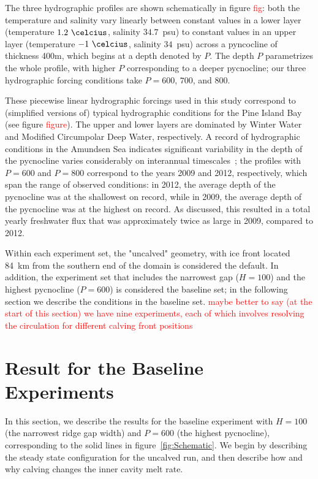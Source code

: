 \documentclass[draft]{agujournal2019}
\newcommand{\red}[1]{\textcolor{red}{#1}}
\begin{document}
The three hydrographic profiles are shown schematically in figure \red{fig}: both the temperature and salinity vary linearly between constant values in a lower layer (temperature $1.2~\si{\celcius}$, salinity $34.7$~psu) to constant values in an upper layer (temperature $-1~\si{\celcius}$, salinity $34$~psu) across a pyncocline of thickness 400m, which begins at a depth denoted by $P$. The depth $P$ parametrizes the whole profile, with higher $P$ corresponding to a deeper pycnocline; our three hydrographic forcing conditions take $P = 600$, $700$, and $800$. 

These piecewise linear hydrographic forcings used in this study correspond to (simplified versions of) typical hydrographic conditions for the Pine Island Bay~\cite{Jacobs1996GRL, Dutrieux2014Science, Jenkins2018NatureGeo} (see figure \red{figure}). The upper and lower layers are dominated by Winter Water and Modified Circumpolar Deep Water, respectively. A record of hydrographic conditions in the Amundsen Sea indicates significant variability in the depth of the pycnocline varies considerably on interannual timescales~\cite{Dutrieux2014Science}; the profiles with $P = 600$ and $P = 800$ correspond to the years 2009 and 2012, respectively, which span the range of observed conditions: in 2012, the average depth of the pycnocline was at the shallowest on record, while in 2009, the average depth of the pycnocline was at the highest on record. As discussed, this resulted in a total yearly freshwater flux that was approximately twice as large in 2009, compared to 2012.

Within each experiment set, the "uncalved" geometry, with ice front located 84~km from the southern end of the domain is considered the default. In addition, the experiment set that includes the narrowest gap ($H = 100$) and the highest pycnocline ($P = 600$) is considered the baseline set; in the following section we describe the conditions in the baseline set. \red{maybe better to say (at the start of this section) we have nine experiments, each of which involves resolving the circulation for different calving front positions}

\section{Result for the Baseline Experiments}\label{S:Baseline}
In this section, we describe the results for the baseline experiment with $H = 100$ (the narrowest ridge gap width) and $P = 600$ (the highest pycnocline), corresponding to the solid lines in figure~\ref{fig:Schematic}. We begin by describing the steady state configuration for the uncalved run, and then describe how and why calving changes the inner cavity melt rate.
\end{document}
